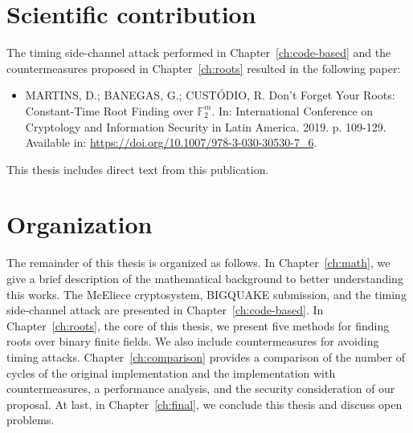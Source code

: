 \section{Scientific contribution}
The timing side-channel attack performed in Chapter~\ref{ch:code-based} and the countermeasures proposed in Chapter~\ref{ch:roots} resulted in the following paper:

\begin{itemize}
    \item  MARTINS, D.; BANEGAS, G.; CUSTÓDIO, R. Don’t Forget Your Roots: Constant-Time Root Finding over $\mathbb{F}_2^m$. In: International Conference on Cryptology and Information Security in Latin America.  2019. p. 109-129. Available in: \url{https://doi.org/10.1007/978-3-030-30530-7_6}.
\end{itemize}

This thesis includes direct text from this publication.

\section{Organization}
The remainder of this thesis is organized as follows. In Chapter~\ref{ch:math}, we give a brief description of the mathematical background to better understanding this works. The McEliece cryptosystem, BIGQUAKE submission, and the timing side-channel attack are presented in Chapter~\ref{ch:code-based}. In Chapter~\ref{ch:roots}, the core of this thesis, we present five methods for finding roots over binary finite fields. We also include countermeasures for avoiding timing attacks. Chapter~\ref{ch:comparison} provides a comparison of the number of cycles of the original implementation and the implementation with countermeasures, a performance analysis, and the security consideration of our proposal. At last, in Chapter~\ref{ch:final}, we conclude this thesis and discuss open problems.
